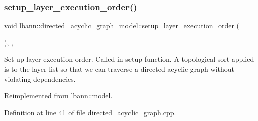 \subsubsection{\texorpdfstring{setup\+\_\+layer\+\_\+execution\+\_\+order()}{setup\_layer\_execution\_order()}}
{\footnotesize\ttfamily void lbann\+::directed\+\_\+acyclic\+\_\+graph\+\_\+model\+::setup\+\_\+layer\+\_\+execution\+\_\+order (\begin{DoxyParamCaption}{ }\end{DoxyParamCaption})\hspace{0.3cm}{\ttfamily [override]}, {\ttfamily [protected]}, {\ttfamily [virtual]}}

Set up layer execution order. Called in setup function. A topological sort applied is to the layer list so that we can traverse a directed acyclic graph without violating dependencies. 

Reimplemented from \hyperlink{classlbann_1_1model_ab0e8af146d4121c1b8b04b4a3c2a455c}{lbann\+::model}.



Definition at line 41 of file directed\+\_\+acyclic\+\_\+graph.\+cpp.


